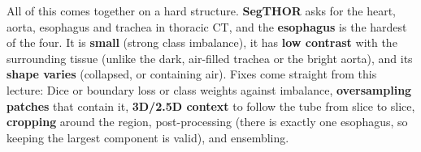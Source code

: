 \documentclass[a4paper]{article}
\newcommand{\K}[1]{\textcolor{kg}{\textbf{#1}}}
\begin{document}
All of this comes together on a hard structure. \K{SegTHOR} asks for the heart, aorta, esophagus and trachea in thoracic CT, and the \K{esophagus} is the hardest of the four. It is \K{small} (strong class imbalance), it has \K{low contrast} with the surrounding tissue (unlike the dark, air-filled trachea or the bright aorta), and its \K{shape varies} (collapsed, or containing air). Fixes come straight from this lecture: Dice or boundary loss or class weights against imbalance, \K{oversampling patches} that contain it, \K{3D/2.5D context} to follow the tube from slice to slice, \K{cropping} around the region, post-processing (there is exactly one esophagus, so keeping the largest component is valid), and ensembling.
\end{document}
